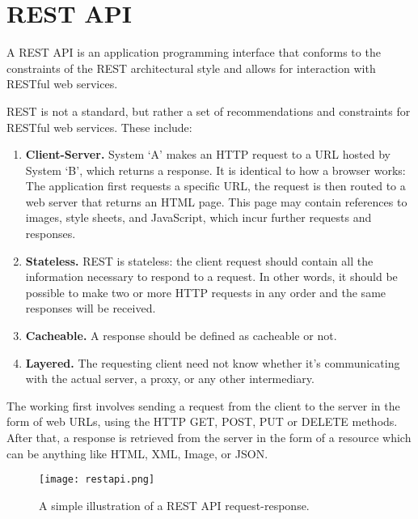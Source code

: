 \section{REST API}

A REST API is an application programming interface that conforms to the constraints of the REST 
architectural style and allows for interaction with RESTful web services.

REST is not a standard, but rather a set of recommendations and constraints for 
RESTful web services. These include:

\begin{enumerate}
    \item \textbf{Client-Server.} System ‘A’ makes an HTTP request to a URL hosted by 
    System ‘B’, which returns a response.
    It is identical to how a browser works: The application first requests a specific URL, the request is then routed to a web server that returns an HTML page. 
    This page may contain references to images, style sheets, and JavaScript, 
    which incur further requests and responses.

    \item \textbf{Stateless.} REST is stateless: the client request should contain all the information necessary to respond to a request. In other words, it should be possible to
    make two or more HTTP requests in any order and the same responses will be received.

    \item \textbf{Cacheable.} A response should be defined as cacheable or not.
    
    \item \textbf{Layered.} The requesting client need not know whether it’s communicating 
    with the actual server, a proxy, or any other intermediary.~\cite{DevelopersRestAPI}
\end{enumerate}

The working first involves sending a request from the client to the server in the form of web URLs, 
using the HTTP GET, POST, PUT or DELETE methods. After that, a response is retrieved from the server 
in the form of a resource which can be anything like HTML, XML, Image, or JSON.~\cite{WhatisRESTAPI}

\begin{figure}
    \begin{center}
        \texttt{[image: restapi.png]}
    \end{center}
    \caption{A simple illustration of a REST API request-response.}
    \label{fig:restapi}
\end{figure}

